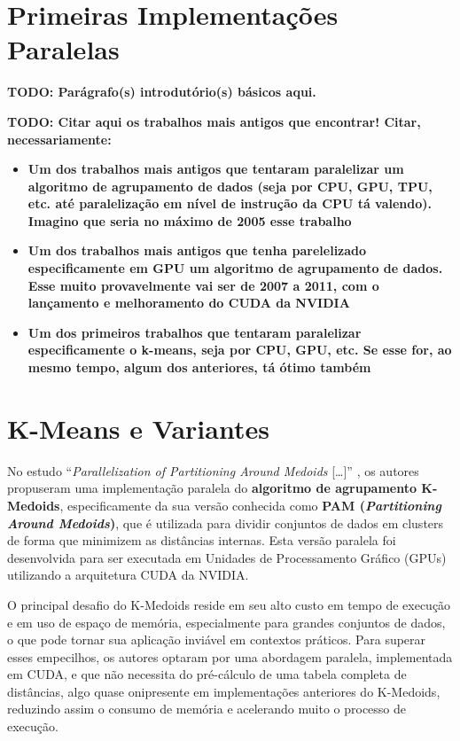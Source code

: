 \documentclass[12pt,
openright, 
oneside, %
a4paper,    %
brazil]{facom-ufu-abntex2}
\begin{document}

\section{Primeiras Implementações Paralelas}


\textbf{TODO: Parágrafo(s) introdutório(s) básicos aqui.}

\textbf{TODO: Citar aqui os trabalhos mais antigos que encontrar! Citar, necessariamente:}

\begin{itemize}
  \item \textbf{Um dos trabalhos mais antigos que tentaram paralelizar um algoritmo de agrupamento de dados (seja por CPU, GPU, TPU, etc. até paralelização em nível de instrução da CPU tá valendo). Imagino que seria no máximo de 2005 esse trabalho}
  \item \textbf{Um dos trabalhos mais antigos que tenha parelelizado especificamente em GPU um algoritmo de agrupamento de dados. Esse muito provavelmente vai ser de 2007 a 2011, com o lançamento e melhoramento do CUDA da NVIDIA}
  \item \textbf{Um dos primeiros trabalhos que tentaram paralelizar especificamente o k-means, seja por CPU, GPU, etc. Se esse for, ao mesmo tempo, algum dos anteriores, tá ótimo também}
\end{itemize}




\section{K-Means e Variantes}

No estudo \enquote{\textit{Parallelization of Partitioning Around Medoids} [\dots]} \cite{pamKMedoids2020}, os autores propuseram uma implementação paralela do \textbf{algoritmo de agrupamento K-Medoids}, especificamente da sua versão conhecida como \textbf{PAM (\textit{Partitioning Around Medoids})}, que é utilizada para dividir conjuntos de dados em clusters de forma que minimizem as distâncias internas. Esta versão paralela foi desenvolvida para ser executada em Unidades de Processamento Gráfico (GPUs) utilizando a arquitetura CUDA da NVIDIA.

O principal desafio do K-Medoids reside em seu alto custo em tempo de execução e em uso de espaço de memória, especialmente para grandes conjuntos de dados, o que pode tornar sua aplicação inviável em contextos práticos. Para superar esses empecilhos, os autores optaram por uma abordagem paralela, implementada em CUDA, e que não necessita do pré-cálculo de uma tabela completa de distâncias, algo quase onipresente em implementações anteriores do K-Medoids, reduzindo assim o consumo de memória e acelerando muito o processo de execução.
\end{document}
